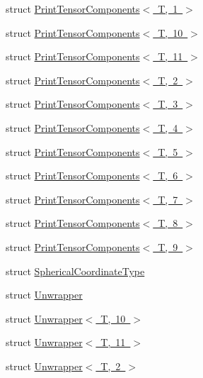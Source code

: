 \begin{DoxyCompactItemize}
struct \mbox{\hyperlink{structmpc_1_1utilities_1_1_print_tensor_components_3_01_t_00_011_01_4}{Print\+Tensor\+Components$<$ T, 1 $>$}}
\item 
struct \mbox{\hyperlink{structmpc_1_1utilities_1_1_print_tensor_components_3_01_t_00_0110_01_4}{Print\+Tensor\+Components$<$ T, 10 $>$}}
\item 
struct \mbox{\hyperlink{structmpc_1_1utilities_1_1_print_tensor_components_3_01_t_00_0111_01_4}{Print\+Tensor\+Components$<$ T, 11 $>$}}
\item 
struct \mbox{\hyperlink{structmpc_1_1utilities_1_1_print_tensor_components_3_01_t_00_012_01_4}{Print\+Tensor\+Components$<$ T, 2 $>$}}
\item 
struct \mbox{\hyperlink{structmpc_1_1utilities_1_1_print_tensor_components_3_01_t_00_013_01_4}{Print\+Tensor\+Components$<$ T, 3 $>$}}
\item 
struct \mbox{\hyperlink{structmpc_1_1utilities_1_1_print_tensor_components_3_01_t_00_014_01_4}{Print\+Tensor\+Components$<$ T, 4 $>$}}
\item 
struct \mbox{\hyperlink{structmpc_1_1utilities_1_1_print_tensor_components_3_01_t_00_015_01_4}{Print\+Tensor\+Components$<$ T, 5 $>$}}
\item 
struct \mbox{\hyperlink{structmpc_1_1utilities_1_1_print_tensor_components_3_01_t_00_016_01_4}{Print\+Tensor\+Components$<$ T, 6 $>$}}
\item 
struct \mbox{\hyperlink{structmpc_1_1utilities_1_1_print_tensor_components_3_01_t_00_017_01_4}{Print\+Tensor\+Components$<$ T, 7 $>$}}
\item 
struct \mbox{\hyperlink{structmpc_1_1utilities_1_1_print_tensor_components_3_01_t_00_018_01_4}{Print\+Tensor\+Components$<$ T, 8 $>$}}
\item 
struct \mbox{\hyperlink{structmpc_1_1utilities_1_1_print_tensor_components_3_01_t_00_019_01_4}{Print\+Tensor\+Components$<$ T, 9 $>$}}
\item 
struct \mbox{\hyperlink{structmpc_1_1utilities_1_1_spherical_coordinate_type}{Spherical\+Coordinate\+Type}}
\item 
struct \mbox{\hyperlink{structmpc_1_1utilities_1_1_unwrapper}{Unwrapper}}
\item 
struct \mbox{\hyperlink{structmpc_1_1utilities_1_1_unwrapper_3_01_t_00_0110_01_4}{Unwrapper$<$ T, 10 $>$}}
\item 
struct \mbox{\hyperlink{structmpc_1_1utilities_1_1_unwrapper_3_01_t_00_0111_01_4}{Unwrapper$<$ T, 11 $>$}}
\item 
struct \mbox{\hyperlink{structmpc_1_1utilities_1_1_unwrapper_3_01_t_00_012_01_4}{Unwrapper$<$ T, 2 $>$}}

\end{DoxyCompactItemize}
